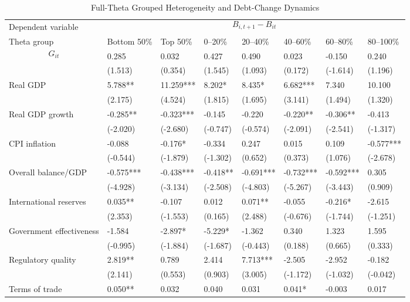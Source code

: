 \begin{table}[H]\centering
\begin{threeparttable}
\caption{Full-Theta Grouped Heterogeneity and Debt-Change Dynamics}
\label{tab:theta_group_heterogeneity_debt}
\scriptsize
\begin{tabularx}{\textwidth}{lYYYYYYY}
\toprule
Dependent variable &  \\
\cmidrule(lr){2-8}
Theta group & Bottom 50\% & Top 50\% & 0--20\% & 20--40\% & 40--60\% & 60--80\% & 80--100\% \\
\midrule
$$G_{it}$$ & 0.285 & 0.032 & 0.427 & 0.490 & 0.023 & -0.150 & 0.240 \\
  & (1.513) & (0.354) & (1.545) & (1.093) & (0.172) & (-1.614) & (1.196) \\
Real GDP & 5.788** & 11.259*** & 8.202* & 8.435* & 6.682*** & 7.340 & 10.100 \\
  & (2.175) & (4.524) & (1.815) & (1.695) & (3.141) & (1.494) & (1.320) \\
Real GDP growth & -0.285** & -0.323*** & -0.145 & -0.220 & -0.220** & -0.306** & -0.413 \\
  & (-2.020) & (-2.680) & (-0.747) & (-0.574) & (-2.091) & (-2.541) & (-1.317) \\
CPI inflation & -0.088 & -0.176* & -0.334 & 0.247 & 0.015 & 0.109 & -0.577*** \\
  & (-0.544) & (-1.879) & (-1.302) & (0.652) & (0.373) & (1.076) & (-2.678) \\
Overall balance/GDP & -0.575*** & -0.438*** & -0.418** & -0.691*** & -0.732*** & -0.592*** & 0.305 \\
  & (-4.928) & (-3.134) & (-2.508) & (-4.803) & (-5.267) & (-3.443) & (0.909) \\
International reserves & 0.035** & -0.107 & 0.012 & 0.071** & -0.055 & -0.216* & -2.615 \\
  & (2.353) & (-1.553) & (0.165) & (2.488) & (-0.676) & (-1.744) & (-1.251) \\
Government effectiveness & -1.584 & -2.897* & -5.229* & -1.362 & 0.340 & 1.323 & 1.595 \\
  & (-0.995) & (-1.884) & (-1.687) & (-0.443) & (0.188) & (0.665) & (0.333) \\
Regulatory quality & 2.819** & 0.789 & 2.414 & 7.713*** & -2.505 & -2.952 & -0.182 \\
  & (2.141) & (0.553) & (0.903) & (3.005) & (-1.172) & (-1.032) & (-0.042) \\
Terms of trade & 0.050** & 0.032 & 0.040 & 0.031 & 0.041* & -0.003 & 0.017 \\

\end{tabularx}
\end{threeparttable}
\end{table}
